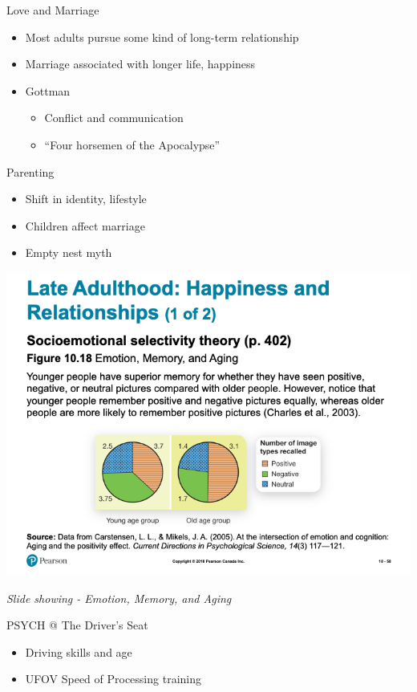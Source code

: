 \documentclass[
]{book}
\providecommand{\tightlist}{%
  \setlength{\itemsep}{0pt}\setlength{\parskip}{0pt}}
\begin{document}
\begin{reflect}
Love and Marriage

\begin{itemize}
\tightlist
\item
  Most adults pursue some kind of long-term relationship
\item
  Marriage associated with longer life, happiness
\item
  Gottman

  \begin{itemize}
  \tightlist
  \item
    Conflict and communication
  \item
    ``Four horsemen of the Apocalypse''
  \end{itemize}
\end{itemize}

Parenting

\begin{itemize}
\tightlist
\item
  Shift in identity, lifestyle
\item
  Children affect marriage
\item
  Empty nest myth
\end{itemize}

\includegraphics{assets/unit_3/slide_58.png}

\emph{Slide showing - Emotion, Memory, and Aging}

PSYCH @ The Driver's Seat

\begin{itemize}
\tightlist
\item
  Driving skills and age
\item
  UFOV Speed of Processing training


\end{itemize}
\end{reflect}
\end{document}
